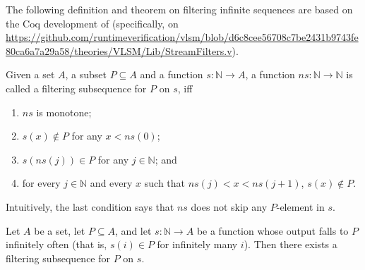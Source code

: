 The following definition and theorem on filtering infinite sequences
are based on the Coq development of \cite{ZamfirVLSM}
(specifically, on \url{https://github.com/runtimeverification/vlsm/blob/d6c8cee56708c7be2431b9743fe80ca6a7a29a58/theories/VLSM/Lib/StreamFilters.v}).
\begin{definition}\label{def:filteringSubsequence}
Given a set $A$, a subset $P \subseteq A$ and a function $s : \mathbb{N} \to A$,
a function $\mathit{ns} : \mathbb{N} \to \mathbb{N}$ is called a filtering subsequence for $P$ on $s$,
iff
\begin{enumerate}
    \item $\mathit{ns}$ is monotone;
    \item $s(x) \not \in P$ for any $x < ns(0)$;
    \item $s(\mathit{ns}(j)) \in P$ for any $j \in \mathbb{N}$; and
    \item for every $j \in \mathbb{N}$ and every $x$ such that $\mathit{ns}(j) < x < \mathit{ns}(j+1)$,
          $s(x) \not\in P$.
\end{enumerate}
Intuitively, the last condition says that $ns$ does not skip any $P$-element in $s$.
\end{definition}

\begin{lemma}\label{lem:filteringSubsequenceExistsForInfinite}
    Let $A$ be a set, let $P \subseteq A$, and let $s : \mathbb{N} \to A$ be a function whose output
    falls to $P$ infinitely often (that is, $s(i) \in P$ for infinitely many $i$).
    Then there exists a filtering subsequence for $P$ on $s$.
\end{lemma}

